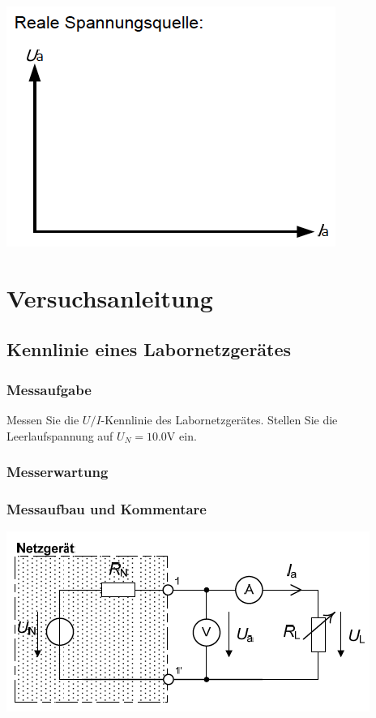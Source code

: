 \begin{enumerate}[$a)$]
\includegraphics[scale=0.5]{../img/III/IIId}
\end{enumerate}
\section{Versuchsanleitung}
\subsection{Kennlinie eines Labornetzgerätes}
\subsubsection{Messaufgabe}
Messen Sie die $U/I$-Kennlinie des Labornetzgerätes. Stellen Sie die Leerlaufspannung auf $U_N=10.0\text{V}$ ein.
\subsubsection{Messerwartung}
\subsubsection{Messaufbau und Kommentare}
\includegraphics[scale=1]{../img/III/IIIe}
